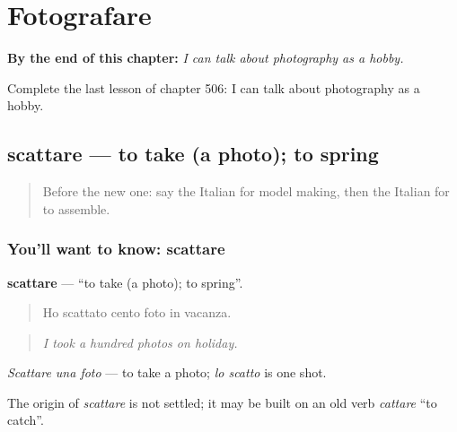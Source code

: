 
\chapter{Fotografare}
\label{ch:it-fotografare}

\begin{chapteropening}
\textbf{By the end of this chapter:} \emph{I can talk about photography as a hobby.}

Complete the last lesson of chapter 506: I can talk about photography as a hobby.
\end{chapteropening}

\section[scattare]{scattare — to take (a photo); to spring}

\label{lesson:IT-C506-scattare}



\begin{quote}
Before the new one: say the Italian for model making, then the Italian for to assemble.
\end{quote}

\subsection*{You'll want to know: scattare}
\textbf{scattare} — \textquotedblleft{}to take (a photo); to spring\textquotedblright{}.

\begin{quote}
Ho scattato cento foto in vacanza.
\end{quote}

\begin{quote}
\emph{I took a hundred photos on holiday.}
\end{quote}

\emph{Scattare una foto} — to take a photo; \emph{lo scatto} is one shot.

\begin{cousinweb}
The origin of \emph{scattare} is not settled; it may be built on an old verb \emph{cattare} \textquotedblleft{}to catch\textquotedblright{}.
\end{cousinweb}


